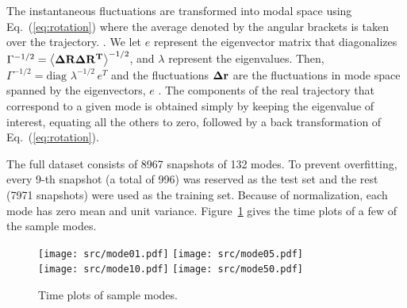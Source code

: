 \documentclass[prl,nofootinbib,twocolumn,floatfix,showpacs]{revtex4}
\begin{document}



The instantaneous fluctuations are transformed into modal space using
Eq.~(\ref{eq:rotation}) where the average denoted by the angular
brackets is taken over the trajectory. \cite{Amadei1993,Yogurtcu2009}.
We let $e$ represent the eigenvector matrix that diagonalizes
$\Gamma^{-1/2} = \left<{\bf \Delta R \Delta R^T} \right>^{-1/2}$, and
$\lambda$ represent the eigenvalues. Then, $\Gamma^{-1/2}= \mbox{diag }
\lambda^{-1/2}\, e^T$ and the fluctuations ${\bf \Delta r}$ are the
fluctuations in mode space spanned by the eigenvectors, $e$
\cite{Yogurtcu2009}. The components of the real trajectory that
correspond to a given mode is obtained simply by keeping the
eigenvalue of interest, equating all the others to zero, followed by a
back transformation of Eq.~(\ref{eq:rotation}).



The full dataset consists of 8967 snapshots of 132 modes.  To prevent
overfitting, every 9-th snapshot (a total of 996) was reserved as the
test set and the rest (7971 snapshots) were used as the training set.
Because of normalization, each mode has zero mean and unit variance.
Figure~\ref{fig:timeplots} gives the time plots of a few of the sample
modes.  


\begin{figure}[h]
  \texttt{[image: src/mode01.pdf]}
  \texttt{[image: src/mode05.pdf]} \\
  \texttt{[image: src/mode10.pdf]}
  \texttt{[image: src/mode50.pdf]}
\caption{Time plots of sample modes.}
\label{fig:timeplots}
\end{figure}
\end{document}
